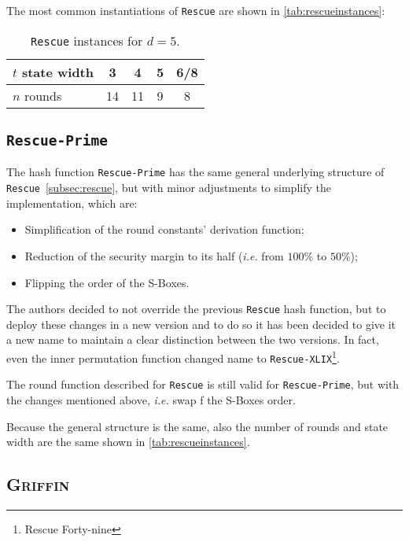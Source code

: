 \documentclass[12pt, a4paper]{report}
\begin{document}
The most common instantiations of \texttt{Rescue} are shown in \autoref{tab:rescueinstances}:
\begin{table}[H]
  \caption{\texttt{Rescue} instances for $d = 5$.}\label{tab:rescueinstances}
  \begin{center}
    \begin{tabular}{|l|c|c|c|c|}
      \hline
      $t$ state width & 3 & 4 & 5 & 6/8 \\
      \hline
      $n$ rounds & 14 & 11 & 9 & 8 \\
      \hline
    \end{tabular}
  \end{center}
\end{table}

\subsection{\texttt{Rescue-Prime}}\label{subsec:rescueprime}

The hash function \texttt{Rescue-Prime} has the same general underlying structure of \texttt{Rescue}~\autoref{subsec:rescue}, but with minor adjustments to simplify the implementation, which are:
\begin{itemize}
  \item Simplification of the round constants' derivation function;
  \item Reduction of the security margin to its half (\textsl{i.e.} from $100\%$ to $50\%$);
  \item Flipping the order of the S-Boxes.
\end{itemize}

The authors decided to not override the previous \texttt{Rescue} hash function, but to deploy these changes in a new version and to do so it has been decided to give it a new name to maintain a clear distinction between the two versions.
In fact, even the inner permutation function changed name to \texttt{Rescue-XLIX}\footnote{Rescue Forty-nine}.

The round function described for \texttt{Rescue} is still valid for \texttt{Rescue-Prime}, but with the changes mentioned above, \textsl{i.e.} swap f the S-Boxes order.

Because the general structure is the same, also the number of rounds and state width are the same shown in \autoref{tab:rescueinstances}.

\subsection{\textsc{Griffin}}\label{subsec:griffin}
\end{document}

